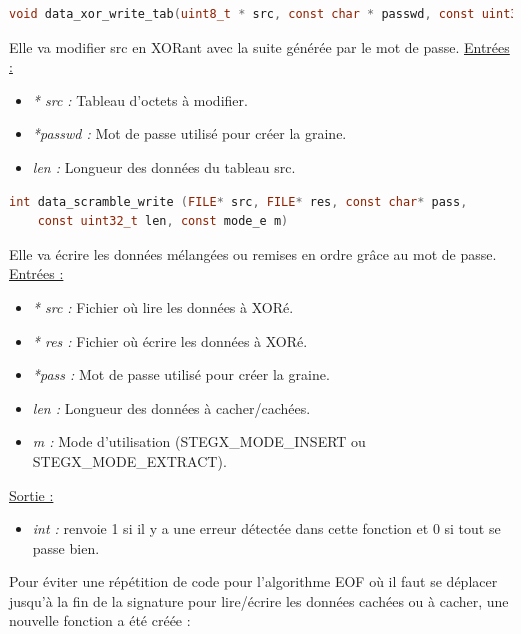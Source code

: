 \documentclass[11pt]{article}
\begin{document}
\begin{lstlisting}[language=c]
void data_xor_write_tab(uint8_t * src, const char * passwd, const uint32_t len);
\end{lstlisting}

Elle va modifier src en XORant avec la suite générée par le mot de passe. 
\newline
\underline{Entrées :}
\begin{itemize}
\item \textit{* src :} Tableau d'octets à modifier. 
\item \textit{*passwd :} Mot de passe utilisé pour créer la graine. 
\item \textit{len :} Longueur des données du tableau src. 
\newline 
\end{itemize}

\begin{lstlisting}[language=c]
int data_scramble_write (FILE* src, FILE* res, const char* pass, 
	const uint32_t len, const mode_e m)
\end{lstlisting}

Elle va écrire les données mélangées ou remises en ordre grâce au mot de 
passe. 
\newline
\underline{Entrées :}
\begin{itemize}
\item \textit{* src :} Fichier où lire les données à XORé. 
\item \textit{* res :} Fichier où écrire les données à XORé. 
\item \textit{*pass :} Mot de passe utilisé pour créer la graine. 
\item \textit{len :} Longueur des données à cacher/cachées. 
\item \textit{m :} Mode d'utilisation (STEGX\_MODE\_INSERT ou STEGX\_MODE\_EXTRACT). 
\end{itemize}
\underline{Sortie :} 
\begin{itemize}
\item \textit{int :} renvoie 1 si il y a une erreur détectée dans cette 
fonction et 0 si tout se passe bien. 
\newline 
\end{itemize}

Pour éviter une répétition de code pour l'algorithme EOF où il faut se 
déplacer jusqu'à la fin de la signature pour lire/écrire les données cachées
 ou à cacher, une nouvelle fonction a été créée : 
\end{document}

